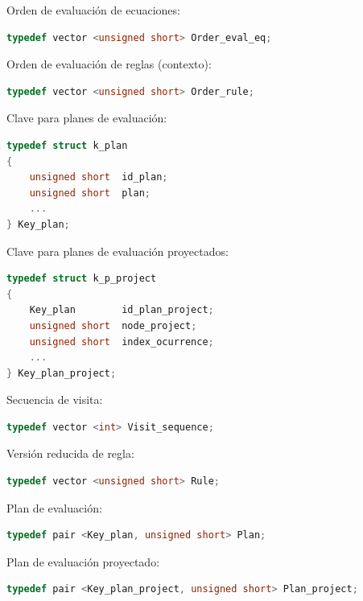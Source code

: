 \begin{items}
\item Orden de evaluación de ecuaciones:
\begin{lstlisting}[basicstyle=\scriptsize, backgroundcolor=\color{white}, language=c++, columns=fullflexible, linewidth=7.5cm]
typedef vector <unsigned short> Order_eval_eq;
\end{lstlisting}

\item Orden de evaluación de reglas (contexto):
\begin{lstlisting}[basicstyle=\scriptsize, backgroundcolor=\color{white}, language=c++, columns=fullflexible, linewidth=7cm]
typedef vector <unsigned short> Order_rule;
\end{lstlisting}

\item Clave para planes de evaluación:
\begin{lstlisting}[basicstyle=\scriptsize, backgroundcolor=\color{white}, language=c++, columns=fullflexible, linewidth=4.3cm]
typedef struct k_plan
{
    unsigned short  id_plan;
    unsigned short  plan;
    ...
} Key_plan;
\end{lstlisting}

\item Clave para planes de evaluación proyectados:
\begin{lstlisting}[basicstyle=\scriptsize, backgroundcolor=\color{white}, language=c++, columns=fullflexible, linewidth=5.5cm]
typedef struct k_p_project
{
    Key_plan        id_plan_project;
    unsigned short  node_project;
    unsigned short  index_ocurrence;
    ...
} Key_plan_project;
\end{lstlisting}

\item Secuencia de visita:
\begin{lstlisting}[basicstyle=\scriptsize, backgroundcolor=\color{white}, language=c++, columns=fullflexible, linewidth=5.7cm]
typedef vector <int> Visit_sequence;
\end{lstlisting}

\item Versión reducida de regla:
\begin{lstlisting}[basicstyle=\scriptsize, backgroundcolor=\color{white}, language=c++, columns=fullflexible, linewidth=6cm]
typedef vector <unsigned short> Rule;
\end{lstlisting}

\item Plan de evaluación:
\begin{lstlisting}[basicstyle=\scriptsize, backgroundcolor=\color{white}, language=c++, columns=fullflexible, linewidth=7.2cm]
typedef pair <Key_plan, unsigned short> Plan;
\end{lstlisting}

\item Plan de evaluación proyectado:
\begin{lstlisting}[basicstyle=\scriptsize, backgroundcolor=\color{white}, language=c++, columns=fullflexible, linewidth=9.5cm]
typedef pair <Key_plan_project, unsigned short> Plan_project;
\end{lstlisting}
\end{items}

\normalsize

